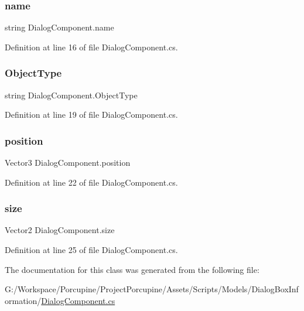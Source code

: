 \mbox{\label{class_dialog_component_aba0c95267ccf7bbf7ae26485b2552a2d}} 
\subsubsection{\texorpdfstring{name}{name}}
{\footnotesize\ttfamily string Dialog\+Component.\+name}



Definition at line 16 of file Dialog\+Component.\+cs.

\mbox{\label{class_dialog_component_ac05a90fd66f19414b616542941e2044a}} 
\subsubsection{\texorpdfstring{Object\+Type}{ObjectType}}
{\footnotesize\ttfamily string Dialog\+Component.\+Object\+Type}



Definition at line 19 of file Dialog\+Component.\+cs.

\mbox{\label{class_dialog_component_a4f51ea11fb406a88d1127938c998beee}} 
\subsubsection{\texorpdfstring{position}{position}}
{\footnotesize\ttfamily Vector3 Dialog\+Component.\+position}



Definition at line 22 of file Dialog\+Component.\+cs.

\mbox{\label{class_dialog_component_a70a1006f902d2d3ec18d40f0a84b57e2}} 
\subsubsection{\texorpdfstring{size}{size}}
{\footnotesize\ttfamily Vector2 Dialog\+Component.\+size}



Definition at line 25 of file Dialog\+Component.\+cs.



The documentation for this class was generated from the following file\+:\begin{DoxyCompactItemize}
\item 
G\+:/\+Workspace/\+Porcupine/\+Project\+Porcupine/\+Assets/\+Scripts/\+Models/\+Dialog\+Box\+Information/\hyperlink{_dialog_component_8cs}{Dialog\+Component.\+cs}\end{DoxyCompactItemize}

